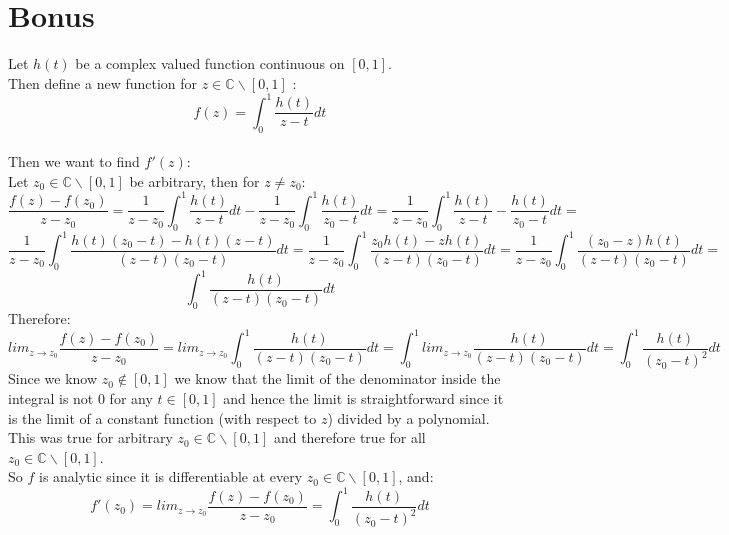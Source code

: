 \documentclass{article}
\begin{document}
\section*{Bonus}
\begin{center}
    \doublespacing
    Let $h(t)$ be a complex valued function continuous on $[0, 1]$.
    \\Then define a new function for $z\in\mathbb{C}\backslash[0,1]$ :
    \[f(z) =\int _0^1\frac{h(t)}{z-t}dt\]
    \\Then we want to find $f'(z)$:
    \\Let $z_0\in\mathbb{C}\backslash[0,1]$ be arbitrary, then for $z\neq z_0$:
    \[\frac{f(z) - f(z_0)}{z - z_0} =\frac{1}{z - z_0}\int _0^1\frac{h(t)}{z -t}dt -\frac{1}{z - z_0}\int _0^1\frac{h(t)}{z_0-t}dt =\frac{1}{z - z_0}\int _0^1\frac{h(t)}{z-t} -\frac{h(t)}{z_0-t}dt =\]
    \[\frac{1}{z - z_0}\int _0^1\frac{h(t)(z_0 - t) - h(t)(z - t)}{(z-t)(z_0 - t)}dt =\frac{1}{z - z_0}\int _0^1\frac{z_0 h(t) - z h(t)}{(z-t)(z_0 - t)}dt =\frac{1}{z - z_0}\int _0^1\frac{(z_0 - z) h(t)}{(z-t)(z_0 - t)}dt =\]
    \[\int _0^1\frac{h(t)}{(z-t)(z_0 - t)}dt\]
    Therefore:
    \[lim _{z\rightarrow z_0}\frac{f(z) - f(z_0)}{z - z_0} = lim_{z\rightarrow z_0}\int _0^1\frac{h(t)}{(z - t)(z_0 - t)}dt =\int _0^1 lim_{z\rightarrow z_0}\frac{h(t)}{(z - t)(z_0 - t)}dt =\int _0^1\frac{h(t)}{(z_0 - t)^2}dt\]
    Since we know $z_0\notin [0, 1]$ we know that the limit of the denominator inside the integral is not 0 for any $t\in [0, 1]$ and hence the limit is straightforward since it is the limit of a constant function (with respect to $z$) divided by a polynomial.
    \break
    \\This was true for arbitrary $z_0\in\mathbb{C}\backslash[0,1]$ and therefore true for all $z_0\in\mathbb{C}\backslash[0,1]$.
    \\So $f$ is analytic since it is differentiable at every $z_0\in\mathbb{C}\backslash[0,1]$, and:
    \[f'(z_0) = lim _{z\rightarrow z_0}\frac{f(z) - f(z_0)}{z - z_0} =\int _0^1\frac{h(t)}{(z_0 - t)^2}dt\]
    \qedsymbol
\end{center}
\end{document}
